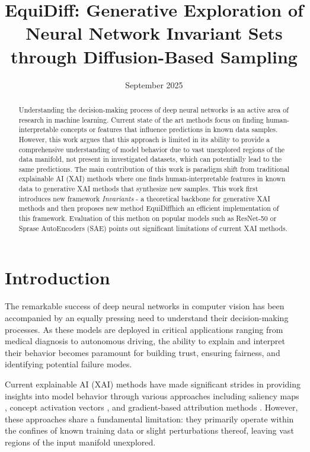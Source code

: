 \documentclass[licencjacka,en]{pracamgr}
\title{EquiDiff: Generative Exploration of Neural Network Invariant Sets through Diffusion-Based Sampling}
\date{September 2025}
\newcommand{\method}[1]{EquiDiff}  %
\newcommand{\framework}[1]{Invariants}  %
\begin{document}
\maketitle

\begin{abstract}
Understanding the decision-making process of deep neural networks is an active area of research in machine learning. Current state of the art methods focus on finding human-interpretable concepts or features that influence predictions in known data samples. However, this work argues that this approach is limited in its ability to provide a comprehensive understanding of model behavior due to vast unexplored regions of the data manifold, not present in investigated datasets, which can potentially lead to the same predictions. The main contribution of this work is paradigm shift from traditional explainable AI (XAI) methods where one finds human-interpretable features in known data to generative XAI methods that synthesize new samples. This work first introduces new framework \textit{\framework{}} - a theoretical backbone for generative XAI methods and then proposes new method \method which an efficient implementation of this framework. Evaluation of this methon on popular models such as ResNet-50 or Sprase AutoEncoders (SAE) points out significant limitations of current XAI methods.
\end{abstract}

\tableofcontents

\chapter{Introduction}\label{r:introduction}

The remarkable success of deep neural networks in computer vision has been accompanied by an equally pressing need to understand their decision-making processes. As these models are deployed in critical applications ranging from medical diagnosis to autonomous driving, the ability to explain and interpret their behavior becomes paramount for building trust, ensuring fairness, and identifying potential failure modes.

Current explainable AI (XAI) methods have made significant strides in providing insights into model behavior through various approaches including saliency maps \citep{simonyan2014deepinsideconvolutionalnetworks}, concept activation vectors \citep{kim2018interpretabilityfeatureattributionquantitative}, and gradient-based attribution methods \citep{sundararajan2017axiomaticattributiondeepnetworks}. However, these approaches share a fundamental limitation: they primarily operate within the confines of known training data or slight perturbations thereof, leaving vast regions of the input manifold unexplored.
\end{document}
